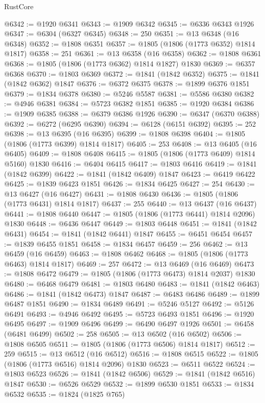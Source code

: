 \begin{lexlean}{RustCore}
\begin{coremodule}
@6342 := @1920 @6341
@6343 := @1909 @6342
@6345 := @6336 @6343 @1926
@6347 := @6304 (@6327 @6345)
@6348 := 250
@6351 := @13 @6348 (@16 @6348)
@6352 := @1808 @6351
@6357 := @1805 (@1806 (@1773 @6352) @1814 @1817)
@6358 := 251
@6361 := @13 @6358 (@16 @6358)
@6362 := @1808 @6361
@6368 := @1805 (@1806 (@1773 @6362) @1814 @1827) @1830
@6369 := @6357 @6368
@6370 := @1803 @6369
@6372 := @1841 (@1842 @6352)
@6375 := @1841 (@1842 @6362) @1847
@6376 := @6372 @6375
@6378 := @1899 @6376 @1851
@6379 := @1834 @6378
@6380 := @5246 @5587
@6381 := @5586 @6380
@6382 := @4946 @6381
@6384 := @5723 @6382 @1851
@6385 := @1920 @6384
@6386 := @1909 @6385
@6388 := @6379 @6386 @1926
@6390 := @6347 (@6370 @6388)
@6392 := @6272 (@6295 @6390)
@6394 := @6128 (@6151 @6392)
@6395 := 252
@6398 := @13 @6395 (@16 @6395)
@6399 := @1808 @6398
@6404 := @1805 (@1806 (@1773 @6399) @1814 @1817)
@6405 := 253
@6408 := @13 @6405 (@16 @6405)
@6409 := @1808 @6408
@6415 := @1805 (@1806 (@1773 @6409) @1814 @5160) @1830
@6416 := @6404 @6415
@6417 := @1803 @6416
@6419 := @1841 (@1842 @6399)
@6422 := @1841 (@1842 @6409) @1847
@6423 := @6419 @6422
@6425 := @1839 @6423 @1851
@6426 := @1834 @6425
@6427 := 254
@6430 := @13 @6427 (@16 @6427)
@6431 := @1808 @6430
@6436 := @1805 (@1806 (@1773 @6431) @1814 @1817)
@6437 := 255
@6440 := @13 @6437 (@16 @6437)
@6441 := @1808 @6440
@6447 := @1805 (@1806 (@1773 @6441) @1814 @2096) @1830
@6448 := @6436 @6447
@6449 := @1803 @6448
@6451 := @1841 (@1842 @6431)
@6454 := @1841 (@1842 @6441) @1847
@6455 := @6451 @6454
@6457 := @1839 @6455 @1851
@6458 := @1834 @6457
@6459 := 256
@6462 := @13 @6459 (@16 @6459)
@6463 := @1808 @6462
@6468 := @1805 (@1806 (@1773 @6463) @1814 @1817)
@6469 := 257
@6472 := @13 @6469 (@16 @6469)
@6473 := @1808 @6472
@6479 := @1805 (@1806 (@1773 @6473) @1814 @2037) @1830
@6480 := @6468 @6479
@6481 := @1803 @6480
@6483 := @1841 (@1842 @6463)
@6486 := @1841 (@1842 @6473) @1847
@6487 := @6483 @6486
@6489 := @1899 @6487 @1851
@6490 := @1834 @6489
@6491 := @5246 @5127
@6492 := @5126 @6491
@6493 := @4946 @6492
@6495 := @5723 @6493 @1851
@6496 := @1920 @6495
@6497 := @1909 @6496
@6499 := @6490 @6497 @1926
@6501 := @6458 (@6481 @6499)
@6502 := 258
@6505 := @13 @6502 (@16 @6502)
@6506 := @1808 @6505
@6511 := @1805 (@1806 (@1773 @6506) @1814 @1817)
@6512 := 259
@6515 := @13 @6512 (@16 @6512)
@6516 := @1808 @6515
@6522 := @1805 (@1806 (@1773 @6516) @1814 @2096) @1830
@6523 := @6511 @6522
@6524 := @1803 @6523
@6526 := @1841 (@1842 @6506)
@6529 := @1841 (@1842 @6516) @1847
@6530 := @6526 @6529
@6532 := @1899 @6530 @1851
@6533 := @1834 @6532
@6535 := @1824 (@1825 @765)

\end{coremodule}
\end{lexlean}
